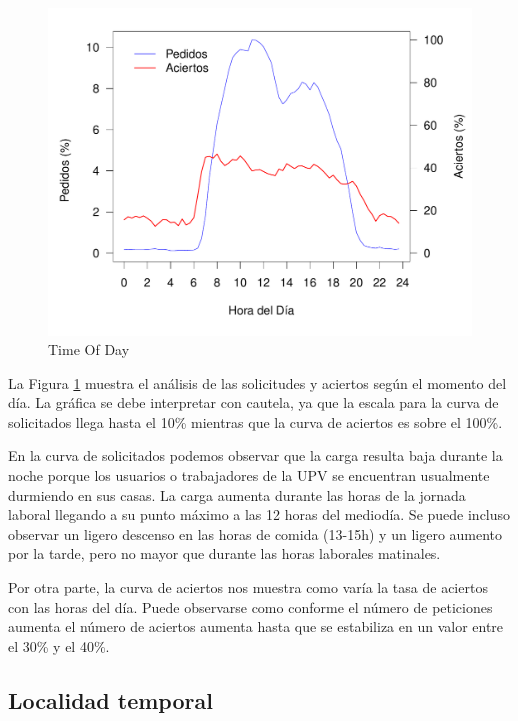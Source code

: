 \documentclass[twocolumn]{Jornadas}
\begin{document}
\begin{figure}[]
\begin{center}
  \includegraphics[scale=0.30]{figures/TimeOfDay3_full.pdf}
\end{center}
\caption{Time Of Day} \label{Timeday}
\end{figure}

La Figura \ref{Timeday} muestra el análisis de las solicitudes y aciertos según el momento del día. La gráfica se debe interpretar con cautela, ya que la escala para la curva de solicitados llega hasta el 10\% mientras que la curva de aciertos es sobre el 100\%. 

En la curva de solicitados podemos observar que la carga resulta baja durante la noche porque los usuarios o trabajadores de la UPV se encuentran usualmente durmiendo en sus casas. La carga aumenta durante las horas de la jornada laboral llegando a su punto máximo a las 12 horas del mediodía. Se puede incluso observar un ligero descenso en las horas de comida (13-15h) y un ligero aumento por la tarde, pero no mayor que durante las horas laborales matinales.

Por otra parte, la curva de aciertos nos muestra como varía la tasa de aciertos con las horas del día. Puede observarse como conforme el número de peticiones aumenta el número de aciertos aumenta hasta que se estabiliza en un valor entre el 30\% y el 40\%.

\subsection{Localidad temporal}
\end{document}

